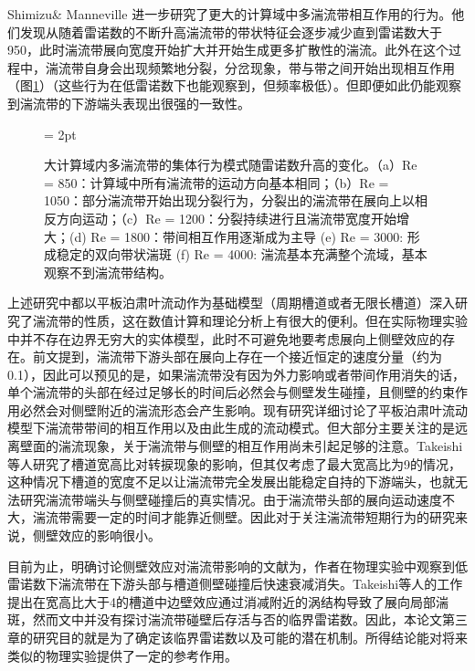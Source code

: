 Shimizu\& Manneville 进一步研究了更大的计算域中多湍流带相互作用的行为\cite{Shimizu2019}。他们发现从随着雷诺数的不断升高湍流带的带状特征会逐步减少直到雷诺数大于950，此时湍流带展向宽度开始扩大并开始生成更多扩散性的湍流。此外在这个过程中，湍流带自身会出现频繁地分裂，分岔现象，带与带之间开始出现相互作用（图\ref{fig:Re_band}）（这些行为在低雷诺数下也能观察到，但频率极低）。但即便如此仍能观察到湍流带的下游端头表现出很强的一致性。
\begin{figure}[htb]
	\subfigbottomskip = 2pt
	\begin{minipage}[h]{\linewidth}
	\centering
	\end{minipage}
	\quad
	\caption{大计算域内多湍流带的集体行为模式随雷诺数升高的变化\cite{Shimizu2019}。（a）Re = 850：计算域中所有湍流带的运动方向基本相同；（b）Re = 1050：部分湍流带开始出现分裂行为，分裂出的湍流带在展向上以相反方向运动；（c）Re = 1200：分裂持续进行且湍流带宽度开始增大；(d) Re = 1800：带间相互作用逐渐成为主导 (e) Re = 3000: 形成稳定的双向带状湍斑 (f) Re = 4000: 湍流基本充满整个流域，基本观察不到湍流带结构。 }
\label{fig:Re_band}
\end{figure}
上述研究中都以平板泊肃叶流动作为基础模型（周期槽道或者无限长槽道）深入研究了湍流带的性质，这在数值计算和理论分析上有很大的便利。但在实际物理实验中并不存在边界无穷大的实体模型，此时不可避免地要考虑展向上侧壁效应的存在。前文提到，湍流带下游头部在展向上存在一个接近恒定的速度分量（约为0.1），因此可以预见的是，如果湍流带没有因为外力影响或者带间作用消失的话，单个湍流带的头部在经过足够长的时间后必然会与侧壁发生碰撞，且侧壁的约束作用必然会对侧壁附近的湍流形态会产生影响。现有研究详细讨论了平板泊肃叶流动模型下湍流带带间的相互作用以及由此生成的流动模式。但大部分主要关注的是远离壁面的湍流现象，关于湍流带与侧壁的相互作用尚未引起足够的注意。Takeishi等人研究了槽道宽高比对转捩现象的影响\cite{Takeishi2015}，但其仅考虑了最大宽高比为9的情况，这种情况下槽道的宽度不足以让湍流带完全发展出能稳定自持的下游端头，也就无法研究湍流带端头与侧壁碰撞后的真实情况。由于湍流带头部的展向运动速度不大，湍流带需要一定的时间才能靠近侧壁。因此对于关注湍流带短期行为的研究来说，侧壁效应的影响很小。

目前为止，明确讨论侧壁效应对湍流带影响的文献为\cite{Paranjape2019}，作者在物理实验中观察到低雷诺数下湍流带在下游头部与槽道侧壁碰撞后快速衰减消失。Takeishi等人的工作提出在宽高比大于4的槽道中边壁效应通过消减附近的涡结构导致了展向局部湍斑\cite{Takeishi2015}，然而文中并没有探讨湍流带碰壁后存活与否的临界雷诺数。因此，本论文第三章的研究目的就是为了确定该临界雷诺数以及可能的潜在机制。所得结论能对将来类似的物理实验提供了一定的参考作用。

